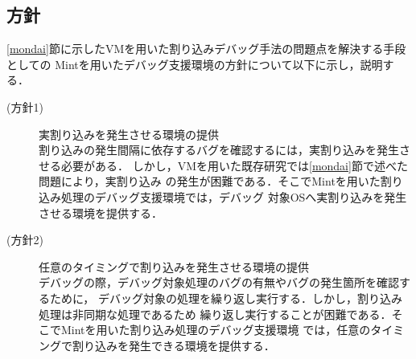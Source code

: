 \documentclass[tanilab-enum]{graduate}
\begin{document}
\subsection{方針}
\ref{mondai}節に示したVMを用いた割り込みデバッグ手法の問題点を解決する手段としての
Mintを用いたデバッグ支援環境の方針について以下に示し，説明する．
\begin{description}
    \item[(方針1)] 実割り込みを発生させる環境の提供\\
        割り込みの発生間隔に依存するバグを確認するには，実割り込みを発生させる必要がある．
        しかし，VMを用いた既存研究では\ref{mondai}節で述べた問題により，実割り込み
        の発生が困難である．そこでMintを用いた割り込み処理のデバッグ支援環境では，デバッグ
        対象OSへ実割り込みを発生させる環境を提供する．
    \item[(方針2)] 任意のタイミングで割り込みを発生させる環境の提供\\
        デバッグの際，デバッグ対象処理のバグの有無やバグの発生箇所を確認するために，
        デバッグ対象の処理を繰り返し実行する．しかし，割り込み処理は非同期な処理であるため
        繰り返し実行することが困難である．そこでMintを用いた割り込み処理のデバッグ支援環境
        では，任意のタイミングで割り込みを発生できる環境を提供する．
\end{description}

\end{document}
